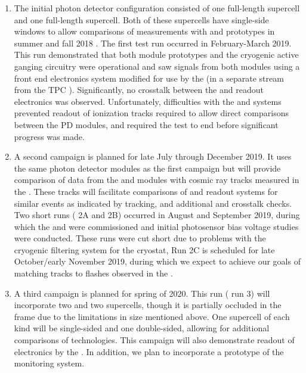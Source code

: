 \begin{enumerate}
    \item The initial photon detector configuration consisted of one full-length  supercell and one full-length  supercell.  Both of these supercells have single-side windows to allow comparisons of measurements with  and  prototypes in summer and fall 2018 .  
    The first test run occurred in February-March 2019. This run demonstrated that both module prototypes and the cryogenic active ganging circuitry were operational and saw signals from both modules using a  front end electronics system modified for use by the   (in a separate stream from the TPC ). Significantly, no crosstalk between the  and  readout electronics was observed.  Unfortunately, difficulties with the   and  systems prevented readout of ionization tracks required to allow direct comparisons between the PD modules, and required the test to end before significant progress was made.


    \item A second campaign is planned for late July through December 2019.  It uses the same photon detector modules as the first campaign but will provide comparison of data from the  and  modules with cosmic ray tracks measured in the .  These tracks will facilitate comparisons of  and  readout systems for similar events as indicated by  tracking, and additional  and  crosstalk checks.  Two short runs ( 2A and 2B) occurred in August and September 2019, during which the  and  were commissioned and initial photosensor bias voltage studies were conducted.  These runs were cut short due to problems with the cryogenic filtering system for the  cryostat,  Run 2C is scheduled for late October/early November 2019, during which we expect to achieve our goals of matching  tracks to flashes observed in the .

    \item A third campaign is planned for spring of 2020.  This run ( run 3) will incorporate two  and two  supercells, though it is partially occluded in the frame due to the limitations in  size mentioned above.  One supercell of each kind will be single-sided and one double-sided, allowing for additional comparisons of  technologies.  This campaign will also demonstrate readout of  electronics by the  .  In addition, we plan to incorporate a prototype of the   monitoring system.
    
\end{enumerate}

